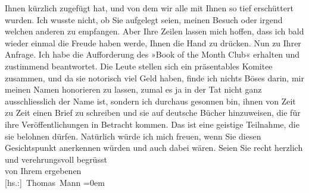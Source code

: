 \begin{ledgroupsized}[t]{13cm}
               Ihnen kürzlich zugefügt hat, und von dem wir alle mit Ihnen so tief erschüttert
               wurden. Ich wusste nicht, ob Sie aufgelegt seien, meinen Besuch oder irgend welchen
               anderen zu empfangen. Aber Ihre Zeilen lassen mich hoffen, dass ich bald wieder
               einmal die Freude haben werde, Ihnen die Hand zu drücken.\pend
           \pstart
           Nun zu Ihrer Anfrage. Ich habe die Aufforderung des »Book
                  of the Month Club« erhalten und zustimmend beantwortet. Die Leute stellen
               sich ein präsentables Komitee zusammen, und da sie notorisch viel Geld haben, finde
               ich nichts Böses darin, mir meinen Namen honorieren zu lassen, zumal es ja in der Tat
               nicht ganz ausschliesslich der Name ist, sondern ich durchaus gesonnen bin, ihnen von
               Zeit zu Zeit einen Brief zu schreiben und sie auf deutsche Bücher hinzuweisen, die
               für ihre Veröffentlichungen in Betracht kommen. Das ist eine geistige Teilnahme, die
               sie belohnen {\pb}dürfen. Natürlich würde ich
               mich freuen, wenn Sie diesen Gesichtspunkt anerkennen würden und auch dabei
               wären.\pend
           \pstart
           Seien Sie recht herzlich und verehrungsvoll begrüsst{\\[\baselineskip]} von Ihrem ergebenen{\\[\baselineskip]}\spacefill\mbox{{[}hs.:{]} Thomas Mann}\pend
           \leftskip=0em{}\endnumbering{}\end{ledgroupsized}  \newcommand{\dateiname}{L02508}\newcommand{\titel}{Thomas Mann an Arthur Schnitzler, 1. 2. 1929}\newcommand{\editorInnen}{Martin Anton Müller und Gerd-Hermann Susen}
      